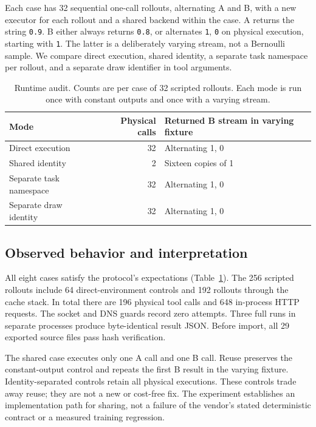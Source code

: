 \documentclass[10pt,letterpaper]{article}
\begin{document}
Each case has 32 sequential one-call rollouts, alternating A and B, with a new
executor for each rollout and a shared backend within the case. A returns the
string \texttt{0.9}. B either always returns \texttt{0.8}, or alternates
\texttt{1}, \texttt{0} on physical execution, starting with \texttt{1}.
The latter is a deliberately varying stream, not a Bernoulli sample.
We compare direct execution, shared identity, a separate task namespace per
rollout, and a separate draw identifier in tool arguments.

\begin{table}[ht]
\centering
\caption{Runtime audit. Counts are per case of 32 scripted rollouts. Each mode
is run once with constant outputs and once with a varying stream.}
\label{tab:runtime}
\begin{tabular}{lrl}
\toprule
Mode & Physical calls & Returned B stream in varying fixture\\
\midrule
Direct execution & 32 & Alternating 1, 0\\
Shared identity & 2 & Sixteen copies of 1\\
Separate task namespace & 32 & Alternating 1, 0\\
Separate draw identity & 32 & Alternating 1, 0\\
\bottomrule
\end{tabular}
\end{table}

\subsection{Observed behavior and interpretation}
All eight cases satisfy the protocol's expectations (Table~\ref{tab:runtime}).
The 256 scripted rollouts include 64 direct-environment controls and 192
rollouts through the cache stack. In total there are 196 physical tool calls
and 648 in-process HTTP requests. The socket and DNS guards record zero
attempts. Three full runs in separate processes produce byte-identical result
JSON. Before import, all 29 exported source files pass hash verification.

The shared case executes only one A call and one B call. Reuse preserves the
constant-output control and repeats the first B result in the varying fixture.
Identity-separated controls retain all physical executions. These controls
trade away reuse; they are not a new or cost-free fix. The experiment establishes
an implementation path for sharing, not a failure of the vendor's stated
deterministic contract or a measured training regression.
\end{document}
